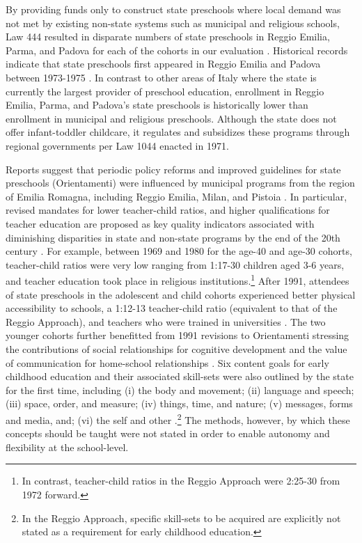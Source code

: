 By providing funds only to construct state preschools where local demand was not met by existing non-state systems such as municipal and religious schools, Law 444 resulted in disparate numbers of state preschools in Reggio Emilia, Parma, and Padova for each of the cohorts in our evaluation \citep{Hohnerlein_2009_Paradox-Public-Preschools}. Historical records indicate that state preschools first appeared in Reggio Emilia and Padova between 1973-1975 \citep{Padova-Admin-Data_1964-2011,Reggio-Admin-data_1966-2006,Reggio-Annual-Journals_1994-2011}. In contrast to other areas of Italy where the state is currently the largest provider of preschool education, enrollment in Reggio Emilia, Parma, and Padova's state preschools is historically lower than enrollment in municipal and religious preschools. Although the state does not offer infant-toddler childcare, it regulates and subsidizes these programs through regional governments per Law 1044 enacted in 1971.

Reports suggest that periodic policy reforms and improved guidelines for state preschools (Orientamenti) were influenced by municipal programs from the region of Emilia Romagna, including Reggio Emilia, Milan, and Pistoia \citep{OECD_2001_Italy-Country-Note}. In particular, revised mandates for lower teacher-child ratios, and higher qualifications for teacher education are proposed as key quality indicators associated with diminishing disparities in state and non-state programs by the end of the 20th century \citep{Hohnerlein_2015_Development-and-Diffusion}. For example, between 1969 and 1980 for the age-40 and age-30 cohorts, teacher-child ratios were very low ranging from 1:17-30 children aged 3-6 years, and teacher education took place in religious institutions.\footnote{In contrast, teacher-child ratios in the Reggio Approach were 2:25-30 from 1972 forward.} After 1991, attendees of state preschools in the adolescent and child cohorts experienced better physical accessibility to schools, a 1:12-13 teacher-child ratio (equivalent to that of the Reggio Approach), and teachers who were trained in universities \citep{Hohnerlein_2015_Development-and-Diffusion}. The two younger cohorts further benefitted from 1991 revisions to Orientamenti stressing the contributions of social relationships for cognitive development and the value of communication for home-school relationships \citep{OECD_2001_Italy-Country-Note}. Six content goals for early childhood education and their associated skill-sets were also outlined by the state for the first time, including (i) the body and movement; (ii) language and speech; (iii) space, order, and measure; (iv) things, time, and nature; (v) messages, forms and media, and; (vi) the self and other \citep{Orientamenti_1991_Scuola-Materna}.\footnote{In the Reggio Approach, specific skill-sets to be acquired are explicitly not stated as a requirement for early childhood education.} The methods, however, by which these concepts should be taught were not stated in order to enable autonomy and flexibility at the school-level.

